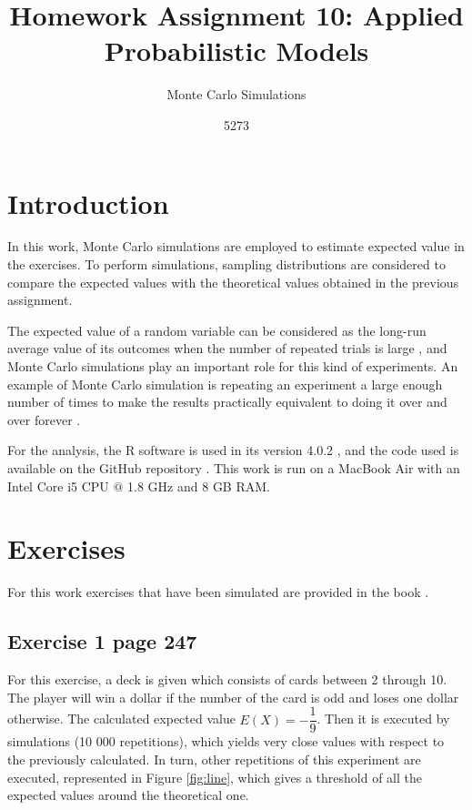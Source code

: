 \documentclass[10pt,leter,openany]{article}
\author{5273}
\title{Homework Assignment 10: Applied Probabilistic Models}
\subtitle{Monte Carlo Simulations}
\date{}
\begin{document}
	
\maketitle

\section{Introduction}
 In this work, Monte Carlo simulations are employed to estimate expected value in the exercises. To perform simulations, sampling distributions are considered to compare the expected values with the theoretical values obtained in the previous assignment.  
 
 The expected value of a random variable can be considered as the long-run average value of its outcomes when the number of repeated trials is large \citep{hanck2020}, and Monte Carlo simulations play an important role for this kind of experiments. An example of Monte Carlo simulation is repeating an experiment a large enough number of times to make the results practically equivalent to doing it over and over forever \citep{akbar2019}. 
 
 For the analysis, the R software is used in its version 4.0.2 \citep{r}, and the code used is available on the GitHub repository \citep{github}. This work is run on a MacBook Air with an Intel Core i5 CPU $ @ $ 1.8 GHz and 8 GB RAM.


\section{Exercises}

For this work exercises that have been simulated are provided in the book \citet{grinstead2012introduction}.

\subsection{Exercise 1 page 247}

For this exercise, a deck is given which consists of cards between 2 through 10. The player will win a dollar if the number of the card is odd and loses one dollar otherwise. The calculated expected value $E(X) = -\dfrac{1}{9}$. Then it is executed by simulations (10 000 repetitions), which yields very close values with respect to the previously calculated. In turn, other repetitions of this experiment are executed, represented in Figure \ref{fig:line}, which gives a threshold of all the expected values around the theoretical one.
\end{document}

